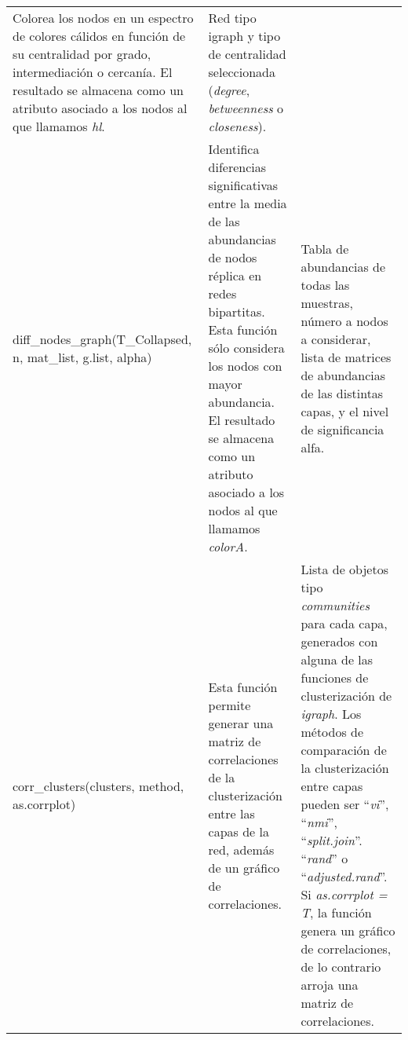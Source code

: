 \documentclass[
]{book}
\begin{document}
\begin{longtable}[]{@{}lll@{}}
\begin{minipage}[t]{0.22\columnwidth}
Colorea los nodos en un espectro de colores cálidos en función de su centralidad por grado, intermediación o cercanía. El resultado se almacena como un atributo asociado a los nodos al que llamamos \emph{hl}.\strut
\end{minipage} & \begin{minipage}[t]{0.35\columnwidth}\raggedright
Red tipo igraph y tipo de centralidad seleccionada (\emph{degree}, \emph{betweenness} o \emph{closeness}).\strut
\end{minipage}\tabularnewline
\begin{minipage}[t]{0.35\columnwidth}\raggedright
diff\_nodes\_graph(T\_Collapsed, n, mat\_list, g.list, alpha)\strut
\end{minipage} & \begin{minipage}[t]{0.22\columnwidth}\raggedright
Identifica diferencias significativas entre la media de las abundancias de nodos réplica en redes bipartitas. Esta función sólo considera los nodos con mayor abundancia. El resultado se almacena como un atributo asociado a los nodos al que llamamos \emph{colorA}.\strut
\end{minipage} & \begin{minipage}[t]{0.35\columnwidth}\raggedright
Tabla de abundancias de todas las muestras, número a nodos a considerar, lista de matrices de abundancias de las distintas capas, y el nivel de significancia alfa.\strut
\end{minipage}\tabularnewline
\begin{minipage}[t]{0.35\columnwidth}\raggedright
corr\_clusters(clusters, method, as.corrplot)\strut
\end{minipage} & \begin{minipage}[t]{0.22\columnwidth}\raggedright
Esta función permite generar una matriz de correlaciones de la clusterización entre las capas de la red, además de un gráfico de correlaciones.\strut
\end{minipage} & \begin{minipage}[t]{0.35\columnwidth}\raggedright
Lista de objetos tipo \emph{communities} para cada capa, generados con alguna de las funciones de clusterización de \emph{igraph}. Los métodos de comparación de la clusterización entre capas pueden ser ``\emph{vi}'', ``\emph{nmi}'', ``\emph{split.join}''. ``\emph{rand}'' o ``\emph{adjusted.rand}''. Si \emph{as.corrplot = T}, la función genera un gráfico de correlaciones, de lo contrario arroja una matriz de correlaciones.\strut
\end{minipage}\tabularnewline
\bottomrule
\end{longtable}
\end{document}
